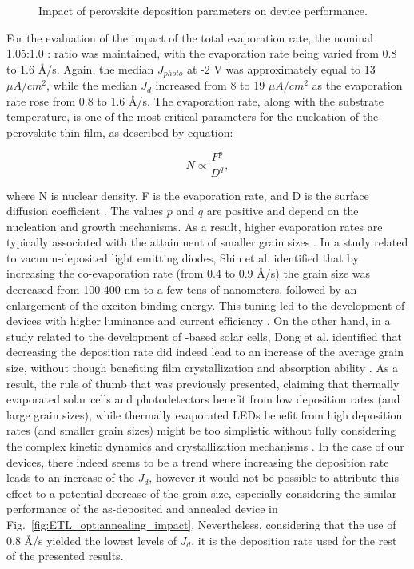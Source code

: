 \begin{figure}[htbp]
\begin{subfigure}[t]{0.45\textwidth}
        \caption{}
        \label{fig:etl:opt:evap_rate}
    \end{subfigure}    
    \caption{Impact of perovskite deposition parameters on device performance.}
    \label{fig:etl_opt:molar_and_rate}
\end{figure}


For the evaluation of the impact of the total evaporation rate, the nominal 1.05:1.0 : ratio was maintained, with the evaporation rate being varied from 0.8 to 1.6 \AA/s. Again, the median $J_{photo}$ at -2 V was approximately equal to 13 $\mu A/cm^2$, while the median $J_d$ increased from 8 to 19 $\mu A/cm^2$ as the evaporation rate rose from 0.8 to 1.6 \AA/s. The evaporation rate, along with the substrate temperature, is one of the most critical parameters for the nucleation of the perovskite thin film, as described by equation: 

\begin{equation}
    N \propto \frac{F^p}{D^q}, 
\end{equation}

where N is nuclear density, F is the evaporation rate, and D is the surface diffusion coefficient \cite{Dong2023GrowthFilm}. The values $p$ and $q$ are positive and depend on the nucleation and growth mechanisms. As a result, higher evaporation rates are typically associated with the attainment of smaller grain sizes \cite{Dong2023GrowthFilm, Du2022ThermalOutlook, Shin2020ModulationDiodes}. In a study related to vacuum-deposited  light emitting diodes, Shin et al. identified that by increasing the co-evaporation rate (from 0.4 to 0.9 \AA/s) the grain size was decreased from 100-400 nm to a few tens of nanometers, followed by an enlargement of the exciton binding energy. This tuning led to the development of devices with higher luminance and current efficiency \cite{Shin2020ModulationDiodes}. On the other hand, in a study related to the development of -based solar cells, Dong et al. identified that decreasing the deposition rate did indeed lead to an increase of the average grain size, without though benefiting film crystallization and absorption ability \cite{Dong2023GrowthFilm}. As a result, the rule of thumb that was previously presented, claiming that thermally evaporated solar cells and photodetectors benefit from low deposition rates (and large grain sizes), while thermally evaporated LEDs benefit from high deposition rates (and smaller grain sizes) might be too simplistic without fully considering the complex kinetic dynamics and crystallization mechanisms \cite{Du2022ThermalOutlook}. In the case of our devices, there indeed seems to be a trend where increasing the deposition rate leads to an increase of the $J_d$, however it would not be possible to attribute this effect to a potential decrease of the grain size, especially considering the similar performance of the as-deposited and annealed device in Fig.~\ref{fig:ETL_opt:annealing_impact}. Nevertheless, considering that the use of 0.8 \AA/s yielded the lowest levels of $J_d$, it is the deposition rate used for the rest of the presented results. 


